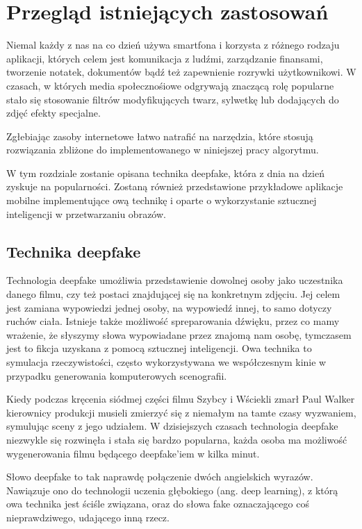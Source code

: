 \chapter{Przegląd istniejących zastosowań}

Niemal każdy z nas na co dzień używa smartfona i korzysta z różnego rodzaju aplikacji, których celem jest komunikacja z ludźmi, zarządzanie finansami, tworzenie notatek, dokumentów bądź też zapewnienie rozrywki użytkownikowi. W czasach, w których media społecznośiowe odgrywają znaczącą rolę popularne stało się stosowanie filtrów modyfikujących twarz, sylwetkę lub dodających do zdjęć efekty specjalne. 

Zgłebiając zasoby internetowe łatwo natrafić na narzędzia, które stosują rozwiązania zbliżone do implementowanego w niniejszej pracy algorytmu.

W tym rozdziale zostanie opisana technika deepfake, która z dnia na dzień zyskuje na popularności. Zostaną również przedstawione przykładowe aplikacje mobilne implementujące ową technikę i oparte o wykorzystanie sztucznej inteligencji w przetwarzaniu obrazów. 


\section{Technika deepfake}
Technologia deepfake umożliwia przedstawienie dowolnej osoby jako uczestnika danego filmu, czy też postaci znajdującej się na konkretnym zdjęciu. Jej celem jest zamiana wypowiedzi jednej osoby, na wypowiedź innej, to samo dotyczy ruchów ciała. Istnieje także możliwość spreparowania dźwięku, przez co mamy wrażenie, że słyszymy słowa wypowiadane przez znajomą nam osobę, tymczasem jest to fikcja uzyskana z pomocą sztucznej inteligencji. Owa technika to symulacja rzeczywistości, często wykorzystywana we współczesnym kinie w przypadku generowania komputerowych scenografii.

Kiedy podczas kręcenia siódmej części filmu Szybcy i Wściekli zmarł Paul Walker kierownicy produkcji musieli zmierzyć się z niemałym na tamte czasy wyzwaniem, symulując sceny z jego udziałem. W dzisiejszych czasach technologia deepfake niezwykle się rozwinęła i stała się bardzo popularna, każda osoba ma możliwość wygenerowania filmu będącego deepfake'iem w kilka minut.

Słowo deepfake to tak naprawdę połączenie dwóch angielskich wyrazów. Nawiązuje ono do technologii uczenia głębokiego (ang. deep learning), z którą owa technika jest ściśle związana, oraz do słowa fake oznaczającego coś nieprawdziwego, udającego inną rzecz.

